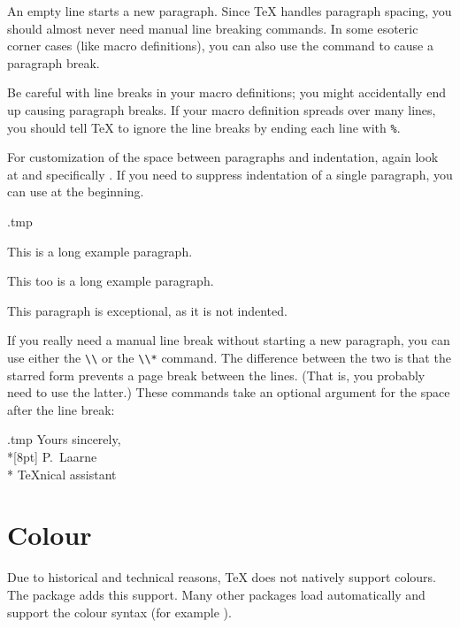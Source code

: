 An empty line starts a new paragraph.
Since \TeX{} handles paragraph spacing, you should almost never need manual line breaking commands.
In some esoteric corner cases (like macro definitions),
you can also use the  command to cause a paragraph break.

\begin{gotcha}
Be careful with line breaks in your macro definitions;
you might accidentally end up causing paragraph breaks.
If your macro definition spreads over many lines,
you should tell \TeX{} to ignore the line breaks by ending each line with \verb|%|.
\end{gotcha}

For customization of the space between paragraphs and indentation,
again look at  and specifically .
If you need to suppress indentation of a single paragraph,
you can use  at the beginning.
%
\begin{VerbatimOut}{\jobname.tmp}
\setlength\parindent{2em}
\setlength\parskip{0pt}

This is a long example paragraph.

This too is a long example paragraph.

\noindent
This paragraph is exceptional,
as it is not indented.
\end{VerbatimOut}
\ShowExample


If you really need a manual line break without starting a new paragraph,
you can use either the \verb|\\| or the \verb|\\*| command.
The difference between the two is that the starred form prevents a page break between the lines.
(That is, you probably need to use the latter.)
These commands take an optional argument for the space after the line break:
%
\begin{VerbatimOut}{\jobname.tmp}
Yours sincerely,\\*[8pt]
P.~Laarne\\*
\TeX nical assistant
\end{VerbatimOut}
\ShowExample



%
%
%
\section{Colour}\label{sec:colour}

Due to historical and technical reasons, \TeX{} does not natively support colours.
The  package adds this support.
Many other packages load  automatically
and support the colour syntax (for example ).


